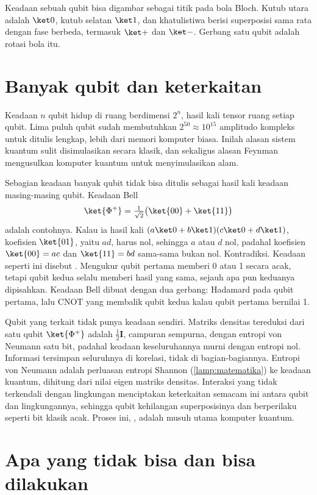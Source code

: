 Keadaan sebuah qubit bisa digambar sebagai titik pada bola Bloch. Kutub utara adalah $\ket0$, kutub selatan $\ket1$, dan khatulistiwa
berisi superposisi sama rata dengan fase berbeda, termasuk $\ket+$ dan $\ket-$. Gerbang satu qubit adalah rotasi bola itu.

\section{Banyak qubit dan keterkaitan}

Keadaan $n$ qubit hidup di ruang berdimensi $2^n$, hasil kali tensor ruang setiap qubit. Lima puluh qubit sudah membutuhkan
$2^{50}\approx10^{15}$ amplitudo kompleks untuk ditulis lengkap, lebih dari memori komputer biasa. Inilah alasan sistem kuantum
sulit disimulasikan secara klasik, dan sekaligus alasan Feynman mengusulkan komputer kuantum untuk menyimulasikan alam.

Sebagian keadaan banyak qubit tidak bisa ditulis sebagai hasil kali keadaan masing-masing qubit. Keadaan Bell
\begin{equation}
\ket{\Phi^+}=\tfrac1{\sqrt2}\big(\ket{00}+\ket{11}\big)
\end{equation}
adalah contohnya. Kalau ia hasil kali $(a\ket0+b\ket1)(c\ket0+d\ket1)$, koefisien $\ket{01}$, yaitu $ad$, harus nol, sehingga $a$ atau $d$
nol, padahal koefisien $\ket{00}=ac$ dan $\ket{11}=bd$ sama-sama bukan nol. Kontradiksi. Keadaan seperti ini disebut .
Mengukur qubit pertama memberi 0 atau 1 secara acak, tetapi qubit kedua selalu memberi hasil yang sama, sejauh apa pun keduanya
dipisahkan. Keadaan Bell dibuat dengan dua gerbang: Hadamard pada qubit pertama, lalu CNOT yang membalik qubit kedua kalau qubit
pertama bernilai 1.

Qubit yang terkait tidak punya keadaan sendiri. Matriks densitas tereduksi dari satu qubit $\ket{\Phi^+}$ adalah $\tfrac12\bm I$, campuran
sempurna, dengan entropi von Neumann satu bit, padahal keadaan keseluruhannya murni dengan entropi nol. Informasi tersimpan
seluruhnya di korelasi, tidak di bagian-bagiannya. Entropi von Neumann adalah perluasan entropi Shannon (\cref{lamp:matematika})
ke keadaan kuantum, dihitung dari nilai eigen matriks densitas. Interaksi yang tidak terkendali dengan lingkungan menciptakan
keterkaitan semacam ini antara qubit dan lingkungannya, sehingga qubit kehilangan superposisinya dan berperilaku seperti bit klasik
acak. Proses ini, , adalah musuh utama komputer kuantum.

\section{Apa yang tidak bisa dan bisa dilakukan}

